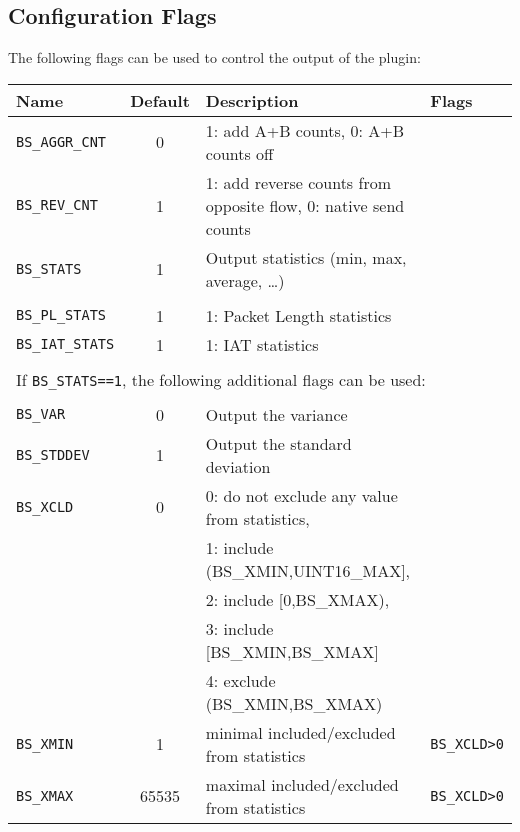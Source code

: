 \documentclass[documentation]{subfiles}
\begin{document}
\subsection{Configuration Flags}
The following flags can be used to control the output of the plugin:
\begin{longtable}{lcll}
    \toprule
    {\bf Name} & {\bf Default} & {\bf Description} & {\bf Flags}\\
    \midrule\endhead%
    {\tt BS\_AGGR\_CNT} & 0 & 1: add A+B counts, 0: A+B counts off\\
    {\tt BS\_REV\_CNT}  & 1 & 1: add reverse counts from opposite flow, 0: native send counts\\
    {\tt BS\_STATS}     & 1 & Output statistics (min, max, average, \ldots)\\\\

    {\tt BS\_PL\_STATS}  & 1 & 1: Packet Length statistics\\
    {\tt BS\_IAT\_STATS} & 1 & 1: IAT statistics\\\\

    \multicolumn{4}{l}{If {\tt BS\_STATS==1}, the following additional flags can be used:}\\\\

    {\tt BS\_VAR}    &     0 & Output the variance \\
    {\tt BS\_STDDEV} &     1 & Output the standard deviation \\
    {\tt BS\_XCLD}   &     0 & 0: do not exclude any value from statistics,\\
                     &       & 1: include (BS\_XMIN,UINT16\_MAX],\\
                     &       & 2: include [0,BS\_XMAX),\\
                     &       & 3: include [BS\_XMIN,BS\_XMAX]\\
                     &       & 4: exclude (BS\_XMIN,BS\_XMAX)\\
    {\tt BS\_XMIN}   &     1 & minimal included/excluded from statistics & {\tt BS\_XCLD>0}\\
    {\tt BS\_XMAX}   & 65535 & maximal included/excluded from statistics & {\tt BS\_XCLD>0}\\
    \bottomrule
\end{longtable}
\end{document}
